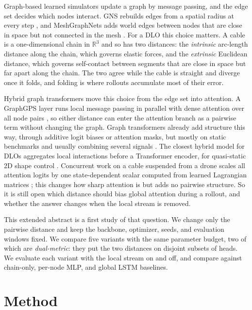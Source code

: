 \documentclass[mlabstract,onecolumn]{jmlr}
\begin{document}
Graph-based learned simulators update a graph by message passing, and the
edge set decides which nodes interact. GNS rebuilds edges from a spatial
radius at every step \citep{sanchezgonzalez2020gns}, and MeshGraphNets adds
world edges between nodes that are close in space but not connected in the
mesh \citep{pfaff2021meshgraphnets}. For a DLO this choice matters. A cable is
a one-dimensional chain in $\mathbb{R}^3$ and so has two distances: the
\emph{intrinsic} arc-length distance along the chain, which governs elastic
forces, and the \emph{extrinsic} Euclidean distance, which governs
self-contact between segments that are close in space but far apart along the
chain. The two agree while the cable is straight and diverge once it folds,
and folding is where rollouts accumulate most of their error.

Hybrid graph transformers move this choice from the edge set into attention.
A GraphGPS layer runs local message passing in parallel with dense attention
over all node pairs \citep{rampasek2022graphgps}, so either distance can enter
the attention branch as a pairwise term without changing the graph. Graph
transformers already add structure this way, through additive logit biases or
attention masks, but mostly on static benchmarks and usually combining several
signals \citep{ying2021graphormer,luo2023transformerm,%
liu2024gradformer,yun2026hopformer}. The closest hybrid model for DLOs
aggregates local interactions before a Transformer encoder, for quasi-static
2D shape control \citep{yu2025eapegat}. Concurrent work on a cable suspended
from a drone scales all attention logits by one state-dependent scalar
computed from learned Lagrangian matrices \citep{pierallini2026pitr}; this
changes how sharp attention is but adds no pairwise structure. So it is still
open which distance should bias global attention during a rollout, and
whether the answer changes when the local stream is removed.

This extended abstract is a first study of that question. We change only the
pairwise distance and keep the backbone, optimizer, seeds, and evaluation
windows fixed. We compare five variants with the same parameter budget, two
of which are \emph{dual-metric}: they put the two distances on disjoint
subsets of heads. We evaluate each variant with the local stream on and off,
and compare against chain-only, per-node MLP, and global LSTM baselines.

\section{Method}
\label{sec:method}
\end{document}
